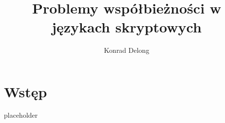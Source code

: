 \documentclass[titlepage]{sprawko}
\begin{document}
\title{\logoKI Problemy współbieżności w językach skryptowych}
\author{Konrad Delong}
\maketitle

\section{Wstęp}
placeholder
\end{document}
